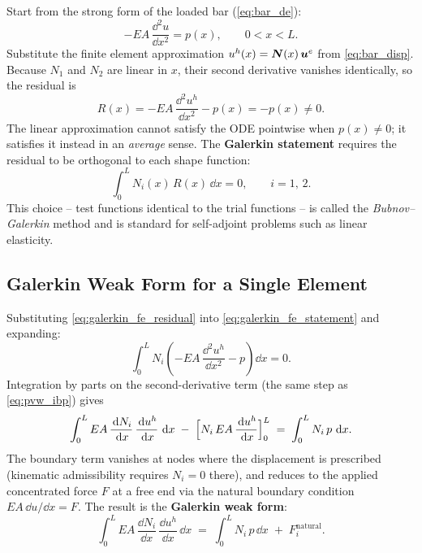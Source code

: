 Start from the strong form of the loaded bar (\cref{eq:bar_de}):
\[
    -EA\,\frac{\dd^2 u}{\dd x^2} = p(x), \qquad 0 < x < L .
\]
Substitute the finite element approximation $u^h(x) = \bm{N}(x)\,\bm{u}^e$
from \cref{eq:bar_disp}. Because $N_1$ and $N_2$ are linear in $x$, their
second derivative vanishes identically, so the residual is
\begin{equation}
    R(x) = -EA\,\frac{\dd^2 u^h}{\dd x^2} - p(x) = -p(x) \neq 0 .
    \label{eq:galerkin_fe_residual}
\end{equation}
The linear approximation cannot satisfy the ODE pointwise when $p(x) \neq 0$;
it satisfies it instead in an \emph{average} sense. The \textbf{Galerkin
statement} requires the residual to be orthogonal to each shape function:
\begin{equation}
    \int_0^L N_i(x)\,R(x)\,\dd x = 0, \qquad i = 1,\,2 .
    \label{eq:galerkin_fe_statement}
\end{equation}
This choice -- test functions identical to the trial functions -- is called the
\emph{Bubnov--Galerkin} method and is standard for self-adjoint problems such
as linear elasticity.

\subsection{Galerkin Weak Form for a Single Element}
\label{sec:galerkin_fe_weak}

Substituting \cref{eq:galerkin_fe_residual} into \cref{eq:galerkin_fe_statement}
and expanding:
\[
    \int_0^L N_i\!\left(-EA\,\frac{\dd^2 u^h}{\dd x^2} - p\right)\dd x = 0 .
\]
Integration by parts on the second-derivative term (the same step as
\cref{eq:pvw_ibp}) gives
\begin{equation}
    \int_0^L EA\,\frac{\,\mathrm{d} N_i}{\,\mathrm{d} x}\,\frac{\,\mathrm{d} u^h}{\,\mathrm{d} x}\,\,\mathrm{d} x
    \;-\;
    \Bigl[N_i\,EA\,\frac{\,\mathrm{d} u^h}{\,\mathrm{d} x}\Bigr]_0^L
    \;=\;
    \int_0^L N_i\,p\,\,\mathrm{d} x .
    \label{eq:galerkin_fe_ibp}
\end{equation}
The boundary term vanishes at nodes where the displacement is prescribed
(kinematic admissibility requires $N_i = 0$ there), and reduces to the applied
concentrated force $F$ at a free end via the natural boundary condition
$EA\,\dd u/\dd x = F$. The result is the \textbf{Galerkin weak form}:
\begin{equation}
    \int_0^L EA\,\frac{\dd N_i}{\dd x}\,\frac{\dd u^h}{\dd x}\,\dd x
    \;=\;
    \int_0^L N_i\,p\,\dd x \;+\; F_i^{\mathrm{natural}} .
    \label{eq:galerkin_fe_weak_i}
\end{equation}

